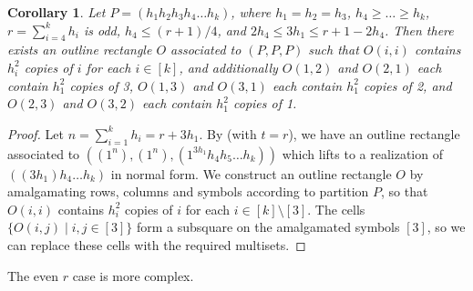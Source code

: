 \documentclass{sn-jnl}
\newtheorem{corollary}[theorem]{Corollary}
\theoremstyle{definition}
\begin{document}
\begin{corollary}
\label{odd_r_from_circulant}
    Let $P=(h_1h_2h_3h_4\dots h_k)$, where $h_1=h_2=h_3$, $h_4 \ge \dots \ge h_k$, $r=\sum_{i=4}^k h_i$ is odd, $h_4 \le (r+1)/4$, and $2h_4 \le 3h_1 \le r+1-2h_4$.
    Then there exists an outline rectangle $O$ associated to $(P,P,P)$ such that $O(i,i)$ contains $h_i^2$ copies of $i$ for each $i\in [k]$, and additionally $O(1,2)$ and $O(2,1)$ each contain $h_1^2$ copies of 3, $O(1,3)$ and $O(3,1)$ each contain $h_1^2$ copies of 2, and $O(2,3)$ and $O(3,2)$ each contain $h_1^2$ copies of 1.  
\end{corollary}
\begin{proof}
    Let $n=\sum_{i=1}^k h_i = r+3h_1$. By  (with $t=r$), we have an outline rectangle associated to $((1^n), (1^n), (1^{3h_1}h_4h_5\dots h_k))$ which lifts to a realization of $((3h_1)h_4\dots h_k)$ in normal form. We construct an outline rectangle $O$ by amalgamating rows, columns and symbols according to partition $P$, so that $O(i,i)$ contains $h_i^2$ copies of $i$ for each $i\in [k] \setminus [3]$. The cells $\{O(i,j) \mid i,j \in [3]\}$ form a subsquare on the amalgamated symbols $[3]$, so we can replace these cells with the required multisets.
\end{proof}

The even $r$ case is more complex.
\end{document}
